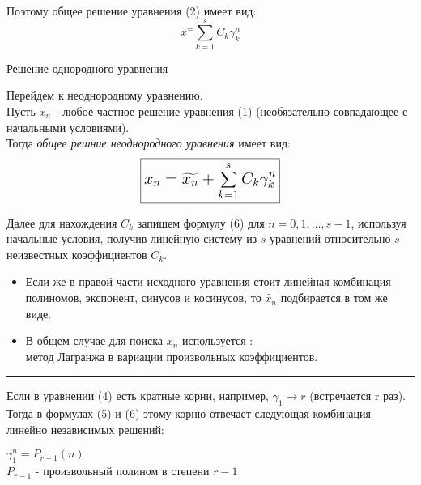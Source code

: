 \documentclass[a4paper,11pt]{article}
\begin{document}
    Поэтому общее решение уравнения (2) имеет вид:
    \begin{equation}
      x^ = \sum_{k=1}^{s}C_k\gamma_k^n
    \end{equation}
    \begin{center}
      Решение однородного уравнения \\
    \end{center}

    Перейдем к неоднородному уравнению. \\

    Пусть $\widetilde{x_n}$ - любое частное решение уравнения (1) (необязательно совпадающее с начальными условиями). \\
    Тогда \textit{общее решние неоднородного уравнения} имеет вид:
    \begin{equation}
      \Large
      {
        \boxed{x_n = \widetilde{x_n} + \sum_{k=1}^{s}C_k\gamma_k^n} \\
      }
    \end{equation}

    Далее для нахождения ${C_k}$ запишем формулу (6) для $n=0,1,...,s-1$, используя начальные условия, получив линейную систему из $s$ уравнений относительно $s$ неизвестных коэффициентов $C_k$. \\
    \begin{itemize}
      \item Если же в правой части исходного уравнения стоит линейная комбинация полиномов, экспонент, синусов и косинусов, то $\widetilde{x_n}$ подбирается в том же виде.
      \item В общем случае для поиска $\widetilde{x_n}$ используется :\\
        $\textbf{метод Лагранжа в вариации произвольных коэффициентов}$.
    \end{itemize}

    \vspace*{20mm}
    \hrule
     Если в уравнении (4) есть кратные корни, например, $\gamma_1 \rightarrow r$ (встречается r раз).
    Тогда в формулах (5) и (6) этому корню отвечает следующая комбинация линейно независимых решений:
    \begin{center}
      $\gamma_1^n = P_{r-1}(n)$ \\
      \footnotesize{$P_{r-1}$ - произвольный полином в степени $r-1$}
    \end{center}
\end{document}
